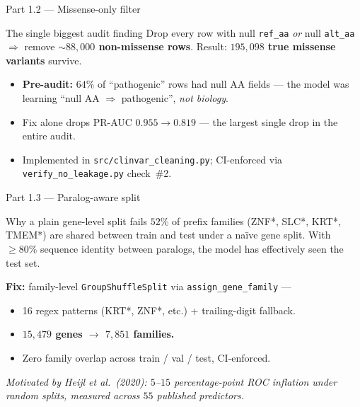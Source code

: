 \documentclass[aspectratio=169,10pt]{beamer}
\begin{document}
\begin{frame}{Part 1.2 --- Missense-only filter}
  \footnotesize
  \begin{block}{The single biggest audit finding}
    Drop every row with null \texttt{ref\_aa} \emph{or} null
    \texttt{alt\_aa} $\Rightarrow$
    remove \textbf{${\sim}88{,}000$ non-missense rows}.
    Result: \textbf{$195{,}098$ true missense variants} survive.
  \end{block}

  \vspace{0.5em}
  \begin{itemize}\setlength{\itemsep}{0.3em}
    \item \textbf{Pre-audit:} $64\%$ of ``pathogenic'' rows had null AA fields ---
          the model was learning ``null AA $\Rightarrow$ pathogenic'',
          \emph{not biology}.
    \item \alert{Fix alone drops PR-AUC $0.955 \rightarrow 0.819$ ---
                 the largest single drop in the entire audit.}
    \item Implemented in \texttt{src/clinvar\_cleaning.py}; CI-enforced
          via \texttt{verify\_no\_leakage.py} check~\#2.
  \end{itemize}
\end{frame}

\begin{frame}{Part 1.3 --- Paralog-aware split}
  \footnotesize
  \begin{block}{Why a plain gene-level split fails}
    $52\%$ of prefix families ({\sc ZNF}*, {\sc SLC}*, {\sc KRT}*,
    {\sc TMEM}*) are shared between train and test under a naïve
    gene split. With $\geq 80\%$ sequence identity between paralogs,
    the model has effectively seen the test set.
  \end{block}

  \vspace{0.4em}
  \textbf{\textcolor{kkuGreen}{Fix:}} family-level
  \texttt{GroupShuffleSplit} via \texttt{assign\_gene\_family} ---
  \begin{itemize}\setlength{\itemsep}{0.15em}
    \item 16 regex patterns ({\sc KRT}*, {\sc ZNF}*, etc.) + trailing-digit fallback.
    \item \textbf{$15{,}479$ genes $\rightarrow$ $7{,}851$ families.}
    \item Zero family overlap across train / val / test, CI-enforced.
  \end{itemize}

  \vspace{0.3em}
  \scriptsize
  \emph{Motivated by Heijl \emph{et al.}\ (2020): $5$--$15$ percentage-point
  ROC inflation under random splits, measured across $55$ published predictors.}
\end{frame}
\end{document}
